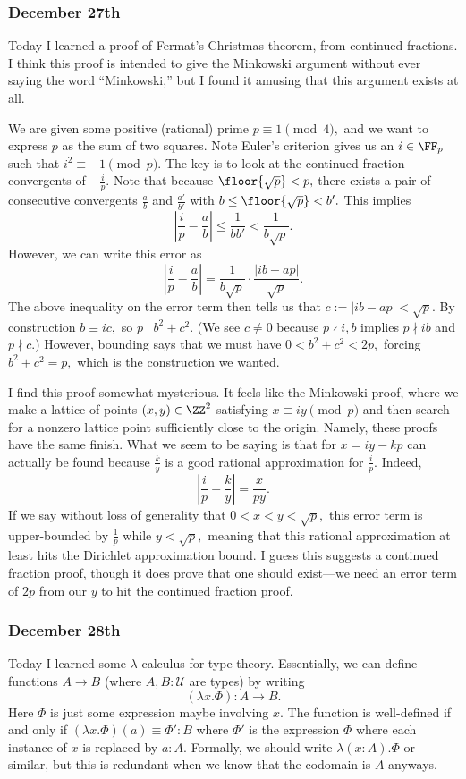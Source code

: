 \subsubsection{December 27th}
Today I learned a proof of Fermat's Christmas theorem, from continued fractions. I think this proof is intended to give the Minkowski argument without ever saying the word ``Minkowski,'' but I found it amusing that this argument exists at all.

We are given some positive (rational) prime $p\equiv1\pmod4,$ and we want to express $p$ as the sum of two squares. Note Euler's criterion gives us an $i\in\FF_p$ such that $i^2\equiv-1\pmod p.$ The key is to look at the continued fraction convergents of $-\frac ip.$ Note that because $\floor{\sqrt p}<p,$ there exists a pair of consecutive convergents $\frac ab$ and $\frac{a'}{b'}$ with $b\le\floor{\sqrt p}<b'.$ This implies
\[\left|\frac ip-\frac ab\right|\le\frac1{bb'}<\frac1{b\sqrt p}.\]
However, we can write this error as
\[\left|\frac ip-\frac ab\right|=\frac1{b\sqrt p}\cdot\frac{|ib-ap|}{\sqrt p}.\]
The above inequality on the error term then tells us that $c:=|ib-ap|<\sqrt p.$ By construction $b\equiv ic,$ so $p\mid b^2+c^2.$ (We see $c\ne0$ because $p\nmid i,b$ implies $p\nmid ib$ and $p\nmid c.$) However, bounding says that we must have $0<b^2+c^2<2p,$ forcing $b^2+c^2=p,$ which is the construction we wanted.

I find this proof somewhat mysterious. It feels like the Minkowski proof, where we make a lattice of points $(x,y)\in\ZZ^2$ satisfying $x\equiv iy\pmod p$ and then search for a nonzero lattice point sufficiently close to the origin. Namely, these proofs have the same finish. What we seem to be saying is that for $x=iy-kp$ can actually be found because $\frac ky$ is a good rational approximation for $\frac ip.$ Indeed,
\[\left|\frac ip-\frac ky\right|=\frac x{py}.\]
If we say without loss of generality that $0<x<y<\sqrt p,$ this error term is upper-bounded by $\frac1p$ while $y<\sqrt p,$ meaning that this rational approximation at least hits the Dirichlet approximation bound. I guess this suggests a continued fraction proof, though it does prove that one should exist---we need an error term of $2p$ from our $y$ to hit the continued fraction proof.

\subsubsection{December 28th}
Today I learned some $\lambda$ calculus for type theory. Essentially, we can define functions $A\to B$ (where $A,B:\mathcal U$ are types) by writing
\[(\lambda x.\Phi):A\to B.\]
Here $\Phi$ is just some expression maybe involving $x.$ The function is well-defined if and only if $(\lambda x.\Phi)(a)\equiv\Phi':B$ where $\Phi'$ is the expression $\Phi$ where each instance of $x$ is replaced by $a:A.$ Formally, we should write $\lambda(x:A).\Phi$ or similar, but this is redundant when we know that the codomain is $A$ anyways.

